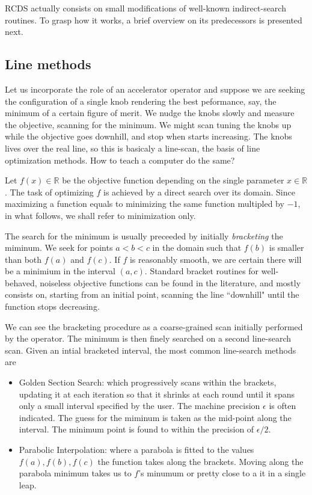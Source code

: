 RCDS actually consists on small modifications of well-known indirect-search routines. To grasp how it works, a brief overview on its predecessors is presented next.

\subsection{Line methods}
Let us incorporate the role of an accelerator operator and suppose we are seeking the configuration of a single knob rendering the best peformance, say, the minimum of a certain figure of merit. We nudge the knobs slowly and measure the objective, scanning for the minimum. We might scan tuning the knobs up while the objective goes downhill, and stop when starts increasing. The knobs lives over the real line, so this is basicaly a line-scan, the basis of line optimization methods. How to teach a computer do the same?

Let $f(x)\in\mathbb{R}$ be the objective function depending on the single parameter $x\in\mathbb{R}$. The task of optimizing $f$ is achieved by a direct search over its domain. Since maximizing a function equals to minimizing the same function multipled by $-1$, in what follows, we shall refer to minimization only.

The search for the minimum is usually preceeded by initially \textit{bracketing} the miminum. We seek for points $a<b<c$ in the domain such that $f(b)$ is smaller than both $f(a)$ and $f(c)$. If $f$ is reasonably smooth, we are certain there will be a minimium in the interval $(a, c)$. Standard bracket routines for well-behaved, noiseless objective functions can be found in the literature, and mostly consists on, starting from an initial point, scanning the line ``downhill" until the function stops decreasing.

We can see the bracketing procedure as a coarse-grained scan initially performed by the operator. The minimum is then finely searched on a second line-search scan. Given an intial bracketed interval, the most common line-search methods are
\begin{itemize}
    \item Golden Section Search: which progressively scans within the brackets, updating it at each iteration so that it shrinks at each round until it spans only a small interval specified by the user. The machine precision $\epsilon$ is often indicated. The guess for the miminum is taken as the mid-point along the interval. The minimum point is found to within the precision of $\epsilon/2$.
    \item Parabolic Interpolation: where a parabola is fitted to the values $f(a), f(b), f(c)$ the function takes along the brackets. Moving along the parabola minimum takes us to $f$'s minumum or pretty close to a it in a single leap.
\end{itemize}

